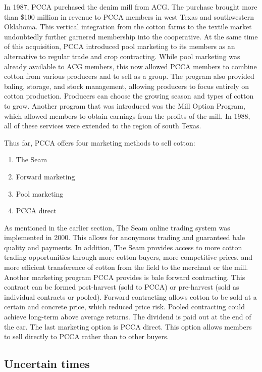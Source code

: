 \documentclass[a4paper]{article}
\begin{document}
In 1987, PCCA purchased the denim mill from ACG. The purchase brought more than \$100 million in revenue to PCCA members in west Texas and southwestern Oklahoma. This vertical integration from the cotton farms to the textile market undoubtedly further garnered membership into the cooperative. At the same time of this acquisition, PCCA introduced pool marketing to its members as an alternative to regular trade and crop contracting. While pool marketing was already available to ACG members, this now allowed PCCA members to combine cotton from various producers and to sell as a group. The program also provided baling, storage, and stock management, allowing producers to focus entirely on cotton production. Producers can choose the growing season and types of cotton to grow. Another program that was introduced was the Mill Option Program, which allowed members to obtain earnings from the profits of the mill. In 1988, all of these services were extended to the region of south Texas. 

Thus far, PCCA offers four marketing methods to sell cotton:
\begin{enumerate}[noitemsep]
	\item The Seam
	\item Forward marketing
	\item Pool marketing
	\item PCCA direct
\end{enumerate}

As mentioned in the earlier section, The Seam online trading system was implemented in 2000. This allows for anonymous trading and guaranteed bale quality and payments. In addition, The Seam provides access to more cotton trading opportunities through more cotton buyers, more competitive prices, and more efficient transference of cotton from the field to the merchant or the mill. Another marketing program PCCA provides is bale forward contracting. This contract can be formed post-harvest (sold to PCCA) or pre-harvest (sold as individual contracts or pooled). Forward contracting allows cotton to be sold at a certain and concrete price, which reduced price risk. Pooled contracting could achieve long-term above average returns. The dividend is paid out at the end of the ear. The last marketing option is PCCA direct. This option allows members to sell directly to PCCA rather than to other buyers.

\subsection{Uncertain times}
\end{document}
